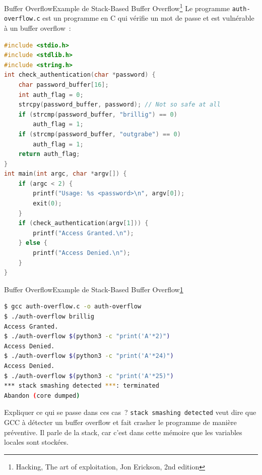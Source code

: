 \documentclass{beamer}
\begin{document}
    \begin{frame}[fragile]{Buffer Overflow}{Example de Stack-Based Buffer Overflow\footnote{\label{hacking}Hacking, The art of exploitation, Jon Erickson, 2nd edition}}
        Le programme \lstinline{auth-overflow.c} est un programme en C qui vérifie un mot de passe et est vulnérable à un buffer overflow~:
        \begin{lstlisting}[language=C,basicstyle=\tiny\ttfamily]
#include <stdio.h>
#include <stdlib.h>
#include <string.h>
int check_authentication(char *password) {
    char password_buffer[16];
    int auth_flag = 0;
    strcpy(password_buffer, password); // Not so safe at all
    if (strcmp(password_buffer, "brillig") == 0)
        auth_flag = 1;
    if (strcmp(password_buffer, "outgrabe") == 0)
        auth_flag = 1;
    return auth_flag;
}
int main(int argc, char *argv[]) {
    if (argc < 2) {
        printf("Usage: %s <password>\n", argv[0]);
        exit(0);
    }
    if (check_authentication(argv[1])) {
        printf("Access Granted.\n");
    } else {
        printf("Access Denied.\n");
    }
}
        \end{lstlisting}
    \end{frame}

    \begin{frame}[fragile]{Buffer Overflow}{Example de Stack-Based Buffer Overflow\cref{hacking}}
        \begin{lstlisting}[language=bash]
$ gcc auth-overflow.c -o auth-overflow
$ ./auth-overflow brillig
Access Granted.
$ ./auth-overflow $(python3 -c "print('A'*2)")
Access Denied.
$ ./auth-overflow $(python3 -c "print('A'*24)")
Access Denied.
$ ./auth-overflow $(python3 -c "print('A'*25)")
*** stack smashing detected ***: terminated
Abandon (core dumped)
        \end{lstlisting}
        Expliquer ce qui se passe dans ces cas~?
        \pause
        \bigbreak
        \lstinline{stack smashing detected} veut dire que GCC à détecter un buffer overflow et fait crasher le programme de manière préventive.
        Il parle de la stack, car c'est dans cette mémoire que les variables locales sont stockées.
    \end{frame}
\end{document}
